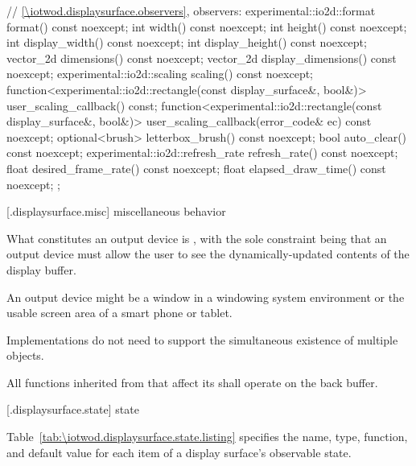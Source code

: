 \begin{codeblock}
{{    // \ref{\iotwod.displaysurface.observers}, observers:
    experimental::io2d::format format() const noexcept;
    int width() const noexcept;
    int height() const noexcept;
    int display_width() const noexcept;
    int display_height() const noexcept;
    vector_2d dimensions() const noexcept;
    vector_2d display_dimensions() const noexcept;
    experimental::io2d::scaling scaling() const noexcept;
    function<experimental::io2d::rectangle(const display_surface&,
      bool&)> user_scaling_callback() const;
    function<experimental::io2d::rectangle(const display_surface&,
      bool&)> user_scaling_callback(error_code& ec) const noexcept;
    optional<brush> letterbox_brush() const noexcept;
    bool auto_clear() const noexcept;
    experimental::io2d::refresh_rate refresh_rate() const noexcept;
    float desired_frame_rate() const noexcept;
    float elapsed_draw_time() const noexcept;
  };
}
\end{codeblock}

 [\iotwod.displaysurface.misc] { miscellaneous behavior}%

\pnum
What constitutes an output device is , with the sole constraint being that an output device must allow the user to see the dynamically-updated contents of the display buffer.
\begin{example}
An output device might be a window in a windowing system environment or the usable screen area of a smart phone or tablet.
\end{example}

\pnum
Implementations do not need to support the simultaneous existence of multiple  objects.

\pnum
All functions inherited from  that affect its \underlyingsurface shall operate on the back buffer.

 [\iotwod.displaysurface.state] { state}

\pnum
Table~\ref{tab:\iotwod.displaysurface.state.listing} specifies the name, type, function, and default value for each item of a display surface's observable state.

